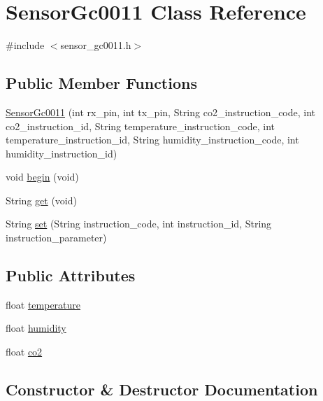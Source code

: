 \hypertarget{class_sensor_gc0011}{}\section{Sensor\+Gc0011 Class Reference}
\label{class_sensor_gc0011}


{\ttfamily \#include $<$sensor\+\_\+gc0011.\+h$>$}

\subsection*{Public Member Functions}
\begin{DoxyCompactItemize}
\item 
\hyperlink{class_sensor_gc0011_ac8b12368b4b524198210048fbd1d0c81}{Sensor\+Gc0011} (int rx\+\_\+pin, int tx\+\_\+pin, String co2\+\_\+instruction\+\_\+code, int co2\+\_\+instruction\+\_\+id, String temperature\+\_\+instruction\+\_\+code, int temperature\+\_\+instruction\+\_\+id, String humidity\+\_\+instruction\+\_\+code, int humidity\+\_\+instruction\+\_\+id)
\item 
void \hyperlink{class_sensor_gc0011_a661743d47448c6b9c965fd8e1f123fbc}{begin} (void)
\item 
String \hyperlink{class_sensor_gc0011_a2920401f54e121bba1398d52e9b2c90a}{get} (void)
\item 
String \hyperlink{class_sensor_gc0011_a658b7856221577342b54e4dc7fe06d2a}{set} (String instruction\+\_\+code, int instruction\+\_\+id, String instruction\+\_\+parameter)
\end{DoxyCompactItemize}
\subsection*{Public Attributes}
\begin{DoxyCompactItemize}
\item 
float \hyperlink{class_sensor_gc0011_a6da77eb384ff77e28c2fa092a03a4cbb}{temperature}
\item 
float \hyperlink{class_sensor_gc0011_af5964ea62f030dd4ea2f219224afa4e6}{humidity}
\item 
float \hyperlink{class_sensor_gc0011_acd7c57373be1c5fb21c8da8c25861138}{co2}
\end{DoxyCompactItemize}


\subsection{Constructor \& Destructor Documentation}
\hypertarget{class_sensor_gc0011_ac8b12368b4b524198210048fbd1d0c81}{}
